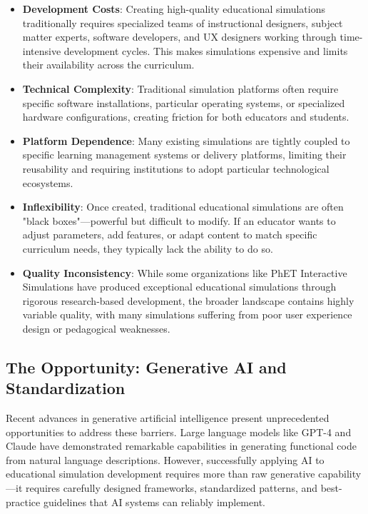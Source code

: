 \begin{itemize}
\item \textbf{Development Costs}: Creating high-quality educational simulations traditionally requires specialized teams of instructional designers, subject matter experts, software developers, and UX designers working through time-intensive development cycles. This makes simulations expensive and limits their availability across the curriculum.

\item \textbf{Technical Complexity}: Traditional simulation platforms often require specific software installations, particular operating systems, or specialized hardware configurations, creating friction for both educators and students.

\item \textbf{Platform Dependence}: Many existing simulations are tightly coupled to specific learning management systems or delivery platforms, limiting their reusability and requiring institutions to adopt particular technological ecosystems.

\item \textbf{Inflexibility}: Once created, traditional educational simulations are often "black boxes"---powerful but difficult to modify. If an educator wants to adjust parameters, add features, or adapt content to match specific curriculum needs, they typically lack the ability to do so.

\item \textbf{Quality Inconsistency}: While some organizations like PhET Interactive Simulations \cite{phet2023} have produced exceptional educational simulations through rigorous research-based development, the broader landscape contains highly variable quality, with many simulations suffering from poor user experience design or pedagogical weaknesses.
\end{itemize}

\subsection{The Opportunity: Generative AI and Standardization}

Recent advances in generative artificial intelligence present unprecedented opportunities to address these barriers. Large language models like GPT-4 and Claude have demonstrated remarkable capabilities in generating functional code from natural language descriptions. However, successfully applying AI to educational simulation development requires more than raw generative capability---it requires carefully designed frameworks, standardized patterns, and best-practice guidelines that AI systems can reliably implement.

